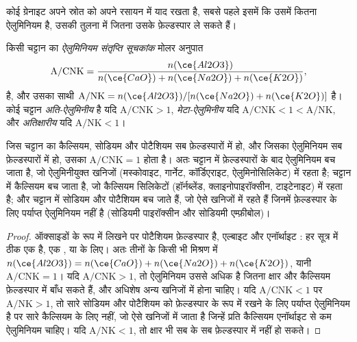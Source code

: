 कोई ग्रेनाइट अपने स्रोत को अपने रसायन में याद रखता है, सबसे पहले इसमें कि उसमें कितना ऐलुमिनियम
है, उसकी तुलना में जितना उसके फ़ेल्डस्पार ले सकते हैं।

\begin{definition}[ऐलुमिनियम संतृप्ति सूचकांक]\label{def:b2:crustal-melting:asi}
किसी चट्टान का \emph{ऐलुमिनियम संतृप्ति सूचकांक}
मोलर अनुपात
\[\mathrm{A/CNK} = \frac{n(\ce{Al2O3})}{n(\ce{CaO}) + n(\ce{Na2O}) + n(\ce{K2O})},\]
है, और उसका साथी $\mathrm{A/NK} = n(\ce{Al2O3})/[n(\ce{Na2O}) + n(\ce{K2O})]$ है। कोई चट्टान
\emph{अति-ऐलुमिनीय} है यदि $\mathrm{A/CNK} > 1$,
\emph{मेटा-ऐलुमिनीय} यदि $\mathrm{A/CNK} < 1 < \mathrm{A/NK}$, और
\emph{अतिक्षारीय} यदि $\mathrm{A/NK} < 1$।
\end{definition}

\begin{proposition}[सूचकांक क्या मापता है]\label{prop:b2:crustal-melting:feldspar}
जिस चट्टान का कैल्सियम, सोडियम और पोटैशियम सब फ़ेल्डस्पारों में हो, और जिसका ऐलुमिनियम
सब फ़ेल्डस्पारों में हो, उसका $\mathrm{A/CNK} = 1$ होता है। अतः  चट्टान में फ़ेल्डस्पारों के बाद
ऐलुमिनियम बच जाता है, जो ऐलुमिनीयुक्त खनिजों (मस्कोवाइट, गार्नेट, कॉर्डिएराइट,
ऐलुमिनोसिलिकेट) में रहता है;  चट्टान में कैल्सियम बच जाता है, जो कैल्सियम सिलिकेटों
(हॉर्नब्लेंड, क्लाइनोपाइरॉक्सीन, टाइटेनाइट) में रहता है; और  चट्टान में सोडियम और पोटैशियम
बच जाते हैं, जो ऐसे खनिजों में रहते हैं जिनमें फ़ेल्डस्पार के लिए पर्याप्त ऐलुमिनियम नहीं है (सोडियमी पाइरॉक्सीन और
सोडियमी एम्फ़ीबोल)।
\end{proposition}

\begin{proof}
ऑक्साइडों के रूप में लिखने पर पोटैशियम फ़ेल्डस्पार  है, एल्बाइट  और
एनॉर्थाइट : हर सूत्र में ठीक एक  है, एक
,  या  के लिए। अतः तीनों के किसी भी मिश्रण में $n(\ce{Al2O3}) =
n(\ce{CaO}) + n(\ce{Na2O}) + n(\ce{K2O})$, यानी $\mathrm{A/CNK} = 1$। यदि
$\mathrm{A/CNK} > 1$, तो ऐलुमिनियम उससे अधिक है जितना क्षार और कैल्सियम
फ़ेल्डस्पार में बाँध सकते हैं, और अधिशेष अन्य खनिजों में होना चाहिए। यदि $\mathrm{A/CNK} < 1$ पर
$\mathrm{A/NK} > 1$, तो सारे सोडियम और पोटैशियम को फ़ेल्डस्पार के रूप में रखने के लिए पर्याप्त ऐलुमिनियम है
पर सारे कैल्सियम के लिए नहीं, जो ऐसे खनिजों में जाता है जिन्हें प्रति कैल्सियम एनॉर्थाइट से कम
ऐलुमिनियम चाहिए। यदि $\mathrm{A/NK} < 1$, तो क्षार भी सब के सब
फ़ेल्डस्पार में नहीं हो सकते।
\end{proof}

